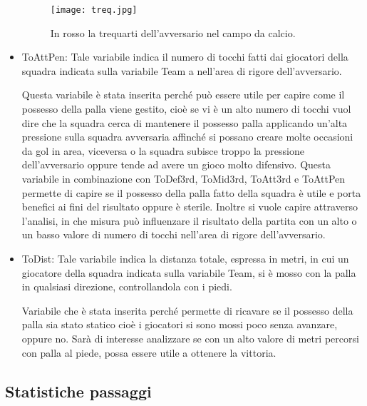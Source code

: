 \begin{itemize}
	\begin{figure}[!ht]
		\begin{center}
			\texttt{[image: treq.jpg]}
			\caption{In rosso la trequarti dell'avversario nel campo da calcio.} 
			\label{fig:treq}
		\end{center}
	\end{figure}
	
	\item \textsf{ToAttPen}: Tale variabile indica il numero di tocchi fatti dai giocatori della squadra indicata sulla variabile \textsf{Team} a nell'area di rigore dell'avversario. 
	
	Questa variabile è stata inserita perché può essere utile per capire come il possesso della palla viene gestito, cioè se vi è un alto numero di tocchi vuol dire che la squadra cerca di mantenere il possesso palla applicando un'alta pressione sulla squadra avversaria affinché si possano creare molte occasioni da gol in area, viceversa o la squadra subisce troppo la pressione dell'avversario oppure tende ad avere un gioco molto difensivo. Questa variabile in combinazione con \textsf{ToDef3rd}, \textsf{ToMid3rd}, \textsf{ToAtt3rd} e \textsf{ToAttPen} permette di capire se il possesso della palla fatto della squadra è utile e porta benefici ai fini del risultato oppure è sterile. Inoltre si vuole capire attraverso l'analisi, in che misura può influenzare il risultato della partita con un alto o un basso valore di numero di tocchi nell'area di rigore dell'avversario.
	
	\item \textsf{ToDist}: Tale variabile indica la distanza totale, espressa in metri, in cui un giocatore della squadra indicata sulla variabile \textsf{Team}, si è mosso con la palla in qualsiasi direzione, controllandola con i piedi.
	
	Variabile che è stata inserita perché permette di ricavare se il possesso della palla sia stato statico cioè i giocatori si sono mossi poco senza avanzare, oppure no. Sarà di interesse analizzare se con un alto valore di metri percorsi con palla al piede, possa essere utile a ottenere la vittoria.

\end{itemize}

\subsection{Statistiche passaggi}

